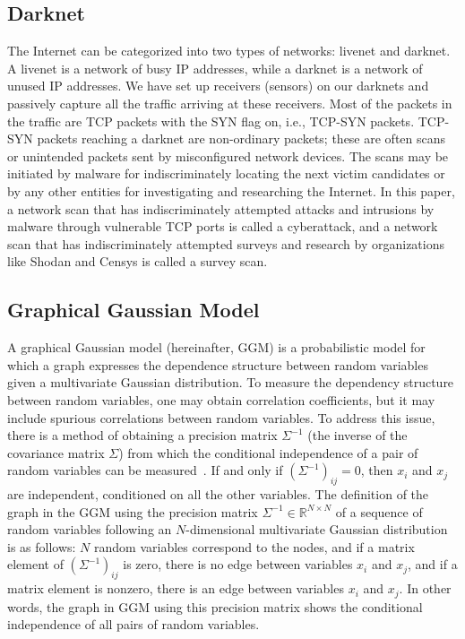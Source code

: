 \documentclass[conference]{IEEEtran}
\begin{document}
\subsection{Darknet}
The Internet can be categorized into two types of networks: livenet and darknet.
A livenet is a network of busy IP addresses, while a darknet is a network of unused IP addresses.
We have set up receivers (sensors) on our darknets and passively capture all the traffic arriving at these receivers.
Most of the packets in the traffic are TCP packets with the SYN flag on, i.e., TCP-SYN packets.
TCP-SYN packets reaching a darknet are non-ordinary packets; these are often scans or unintended packets sent by misconfigured network devices.
The scans may be initiated by malware for indiscriminately locating the next victim candidates or by any other entities for investigating and researching the Internet.
In this paper, a network scan that has indiscriminately attempted attacks and intrusions by malware through vulnerable TCP ports is called a cyberattack, and a network scan that has indiscriminately attempted surveys and research by organizations like Shodan and Censys is called a survey scan.



\subsection{Graphical Gaussian Model}
A graphical Gaussian model (hereinafter, GGM) is a probabilistic model for which a graph expresses the dependence structure between random variables given a multivariate Gaussian distribution.
To measure the dependency structure between random variables, one may obtain correlation coefficients, but it may include spurious correlations between random variables.
To address this issue, there is a method of obtaining a precision matrix $\Sigma^{-1}$ (the inverse of the covariance matrix $\Sigma$) from which the conditional independence of a pair of random variables can be measured~\cite{Ide}.
If and only if $(\Sigma^{-1})_{ij}=0$, then $x_ {i}$ and $x_ {j}$ are independent, conditioned on all the other variables.
The definition of the graph in the GGM using the precision matrix $\Sigma^{-1}\in\mathbb{R}^{N \times N}$ of a sequence of random variables following an $N$-dimensional multivariate Gaussian distribution is as follows: $N$ random variables correspond to the nodes, and if a matrix element of $(\Sigma^{-1})_{ij}$ is zero, there is no edge between variables $x_i$ and $x_j$, and if a matrix element is nonzero, there is an edge between variables $x_i$ and $x_j$.
In other words, the graph in GGM using this precision matrix shows the conditional independence of all pairs of random variables.
\end{document}

